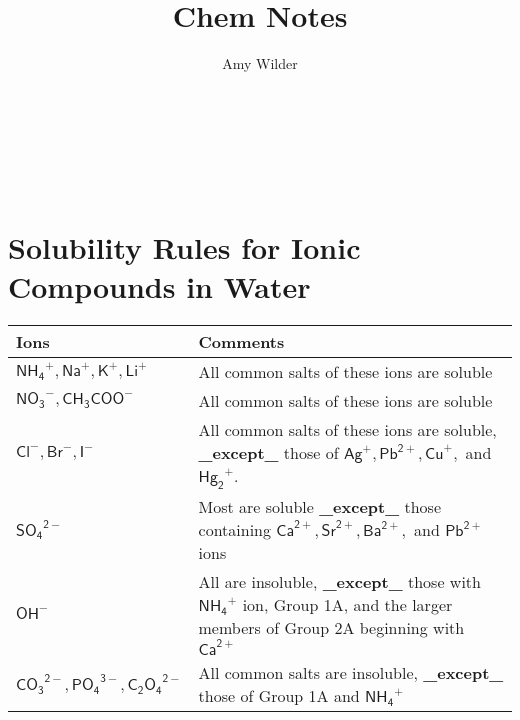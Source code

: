 \documentclass{article}
\title{Chem Notes}
\author{Amy Wilder}
\theoremstyle{mytheoremstyle}
\theoremstyle{mytheoremstyle}
\theoremstyle{myproblemstyle}
\begin{document}
\maketitle

\noindent
{}\quad
{}\\
\quad
{}\quad
{}\quad
{}\quad
{}\quad
{}\quad
{}\quad
{}\quad \\

 \\


\section{Solubility Rules for Ionic Compounds in Water}

\begin{tabular}{lp{4in}}
    \textbf{Ions} & \textbf{Comments} \\
    \hline
    \(\mathsf{{NH_4}^+, {Na}^+, {K}^+, {Li}^+}\)         & All common salts of these ions are soluble \\
    \(\mathsf{{NO_3}^-, {CH_3COO}^-}\)                   & All common salts of these ions are soluble \\
    \(\mathsf{{Cl}^-, {Br}^-, {I}^-}\)                   & All common salts of these ions are soluble, \textbf{\_except\_} those of \(\mathsf{{Ag}^+, {Pb}^{2+}, {Cu}^+,}\) and \(\mathsf{{{Hg}_2}^+}\). \\
    \(\mathsf{{SO_4}^{2-}}\)                             & Most are soluble \textbf{\_except\_} those containing \(\mathsf{{Ca}^{2+}, {Sr}^{2+}, {Ba}^{2+},}\) and \(\mathsf{{Pb}^{2+}}\) ions \\
    \(\mathsf{{OH}^-}\)                                  & All are insoluble, \textbf{\_except\_} those with \(\mathsf{{NH_4}^+}\) ion, Group 1A, and the larger members of Group 2A beginning with \(\mathsf{{Ca}^{2+}}\) \\
    \(\mathsf{{CO_3}^{2-}, {PO_4}^{3-}, {C_2O_4}^{2-}}\) & All common salts are insoluble, \textbf{\_except\_} those of Group 1A and \(\mathsf{{NH_4}^+}\) \\
\end{tabular}
\end{document}
